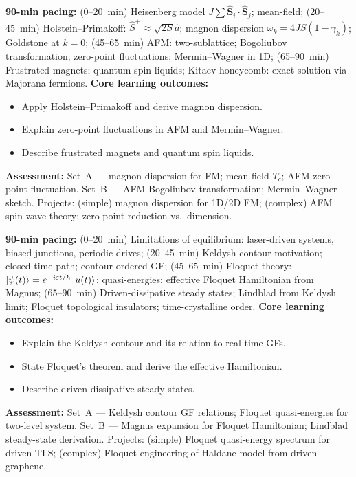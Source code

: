 \documentclass[11pt,a4paper]{article}
\begin{document}
\medskip

\begin{tcolorbox}[modulebox, title={Module~II.4 --- Lecture L11: Quantum Magnetism}]
\textbf{90-min pacing:} (0--20~min) Heisenberg model $J\sum\hat{\mathbf{S}}_i\cdot\hat{\mathbf{S}}_j$; mean-field; (20--45~min) Holstein--Primakoff: $\hat{S}^+\approx\sqrt{2S}\hat{a}$; magnon dispersion $\omega_k=4JS(1-\gamma_k)$; Goldstone at $k=0$; (45--65~min) AFM: two-sublattice; Bogoliubov transformation; zero-point fluctuations; Mermin--Wagner in 1D; (65--90~min) Frustrated magnets; quantum spin liquids; Kitaev honeycomb: exact solution via Majorana fermions.
\medskip\textbf{Core learning outcomes:}
\begin{itemize}[leftmargin=1.4em,topsep=2pt,itemsep=1pt]
  \item Apply Holstein--Primakoff and derive magnon dispersion.
  \item Explain zero-point fluctuations in AFM and Mermin--Wagner.
  \item Describe frustrated magnets and quantum spin liquids.
\end{itemize}
\medskip\textbf{Assessment:}
Set~A --- magnon dispersion for FM; mean-field $T_c$; AFM zero-point fluctuation.
Set~B --- AFM Bogoliubov transformation; Mermin--Wagner sketch.
Projects: (simple) magnon dispersion for 1D/2D FM; (complex) AFM spin-wave theory: zero-point reduction vs.\ dimension.
\end{tcolorbox}

\medskip

\begin{tcolorbox}[modulebox, title={Module~II.4 --- Lecture L12: Towards Non-Equilibrium}]
\textbf{90-min pacing:} (0--20~min) Limitations of equilibrium: laser-driven systems, biased junctions, periodic drives; (20--45~min) Keldysh contour motivation; closed-time-path; contour-ordered GF; (45--65~min) Floquet theory: $\ket{\psi(t)}=e^{-i\varepsilon t/\hbar}\ket{u(t)}$; quasi-energies; effective Floquet Hamiltonian from Magnus; (65--90~min) Driven-dissipative steady states; Lindblad from Keldysh limit; Floquet topological insulators; time-crystalline order.
\medskip\textbf{Core learning outcomes:}
\begin{itemize}[leftmargin=1.4em,topsep=2pt,itemsep=1pt]
  \item Explain the Keldysh contour and its relation to real-time GFs.
  \item State Floquet's theorem and derive the effective Hamiltonian.
  \item Describe driven-dissipative steady states.
\end{itemize}
\medskip\textbf{Assessment:}
Set~A --- Keldysh contour GF relations; Floquet quasi-energies for two-level system.
Set~B --- Magnus expansion for Floquet Hamiltonian; Lindblad steady-state derivation.
Projects: (simple) Floquet quasi-energy spectrum for driven TLS; (complex) Floquet engineering of Haldane model from driven graphene.
\end{tcolorbox}
\end{document}
